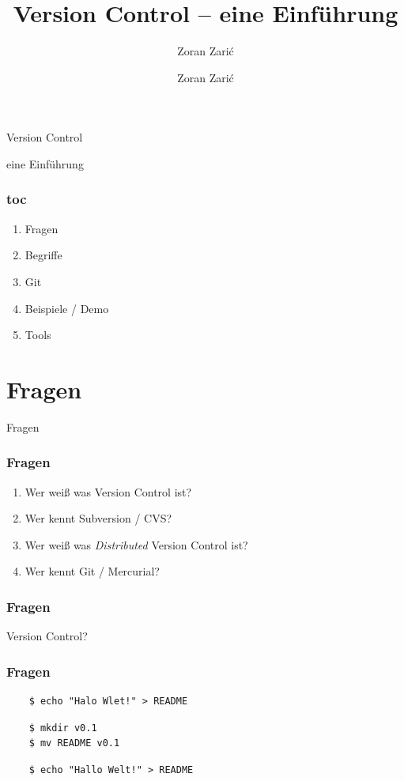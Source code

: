 \documentclass[]{beamer}
\begin{document}

\title[Version Control]{Version Control -- eine Einführung}
\subtitle[Zoran Zari\'c]{Zoran Zari\'c}
\author[Zoran Zari\'c]{Zoran Zari\'c}

\begin{frame}
	\fontsize{30}{10}\selectfont Version Control
	\vspace*{0.5cm}

	\fontsize{20}{10}\selectfont eine Einführung
\end{frame}

\begin{frame}
	\frametitle{toc}
	\begin{enumerate}
		\item
			Fragen
		\item
			Begriffe
		\item
			Git
		\item
			Beispiele / Demo
		\item
			Tools
	\end{enumerate}
\end{frame}

\section{Fragen}
\begin{frame}
	\fontsize{30}{10}\selectfont Fragen
\end{frame}

\begin{frame}
	\frametitle{Fragen}
	\begin{enumerate}
		\item<1->
			Wer weiß was Version Control ist?
		\item<2->
			Wer kennt Subversion / CVS?
		\item<3->
			Wer weiß was \emph{Distributed} Version Control ist?
		\item<4->
			Wer kennt Git / Mercurial?

	\end{enumerate}
\end{frame}

\begin{frame}
	\frametitle{Fragen}
	\Huge{Version Control?}\\
\end{frame}

\begin{frame}[fragile]
	\frametitle{Fragen}
	\begin{verbatim}
	$ echo "Halo Wlet!" > README
	\end{verbatim}

	\begin{verbatim}
	$ mkdir v0.1
	$ mv README v0.1
	\end{verbatim}

	\begin{verbatim}
	$ echo "Hallo Welt!" > README
	\end{verbatim}
\end{frame}
\end{document}
